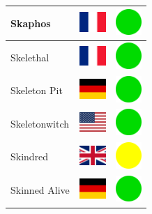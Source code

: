 \documentclass[12pt, a4paper, twoside]{report}
\begin{document}
\begin{center}
\begin{longtable}{|p{5cm}|p{2cm}|p{2cm}|}
 Skaphos                                                    & \includegraphics[width=1cm]{../img/flags/fr} &   \includegraphics[width=1cm]{../likes/y} \\ \hline
 Skelethal                                                  & \includegraphics[width=1cm]{../img/flags/fr} &   \includegraphics[width=1cm]{../likes/y} \\ \hline
 Skeleton Pit                                               & \includegraphics[width=1cm]{../img/flags/de} &   \includegraphics[width=1cm]{../likes/y} \\ \hline
 Skeletonwitch                                              & \includegraphics[width=1cm]{../img/flags/us} &   \includegraphics[width=1cm]{../likes/y} \\ \hline
 Skindred                                                   & \includegraphics[width=1cm]{../img/flags/gb} &   \includegraphics[width=1cm]{../likes/m} \\ \hline
 Skinned Alive                                              & \includegraphics[width=1cm]{../img/flags/de} &   \includegraphics[width=1cm]{../likes/y} \\ \hline

\end{longtable}
\end{center}
\end{document}
